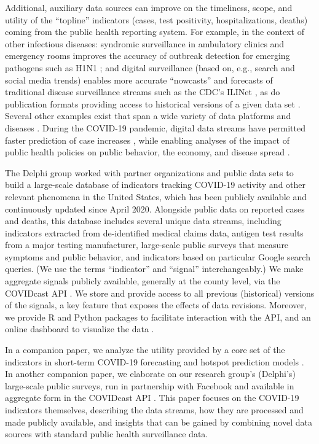 \documentclass[11pt]{article}
\begin{document}
Additional, auxiliary data sources can improve on the timeliness, scope, and
utility of the ``topline'' indicators (cases, test positivity, hospitalizations,
deaths) coming from the public health reporting system. For example, in the
context of other infectious diseases: syndromic surveillance in ambulatory
clinics and emergency rooms improves the accuracy of outbreak detection for
emerging pathogens such as H1N1 \cite{Kass-Hout:2012}; and digital surveillance
(based on, e.g., search and social media trends) enables more accurate
``nowcasts'' and forecasts of traditional disease surveillance streams such as
the CDC's ILINet \cite{Santillana:2015, Farrow:2016}, as do publication formats
providing access to historical versions of a given data set \cite{Brooks:2018,
  Brooks:2020}. Several other examples exist that span a wide variety of data
platforms and diseases \cite{Brownstein:2009, Kass-Hout:2011, Salathe:2012,
  Kass-Hout:2013}. During the COVID-19 pandemic, digital data streams have
permitted faster prediction of case increases \cite{Ahmad:2020, Kogan:2021},
while enabling analyses of the impact of public health policies on public
behavior, the economy, and disease spread \cite{Bonaccorsi:2020, Nouvellet:2021,
  Adjodah:2021, Jewell:2021}.

The Delphi group worked with partner organizations and public data sets to build
a large-scale database of indicators tracking COVID-19 activity and other
relevant phenomena in the United States, which has been publicly available and
continuously updated since April 2020. Alongside public data on reported cases
and deaths, this database includes several unique data streams, including
indicators extracted from de-identified medical claims data, antigen test
results from a major testing manufacturer, large-scale public surveys that
measure symptoms and public behavior, and indicators based on particular Google
search queries. (We use the terms ``indicator'' and ``signal'' interchangeably.)
We make aggregate signals publicly available, generally at the county level, via
the COVIDcast API \cite{CovidcastAPI}. We store and provide access to all
previous (historical) versions of the signals, a key feature that exposes the
effects of data revisions. Moreover, we provide R \cite{CovidcastR} and Python
\cite{CovidcastPy} packages to facilitate interaction with the API, and an
online dashboard to visualize the data \cite{CovidcastViz}.

In a companion paper, we analyze the utility provided by a core set of the
indicators in short-term COVID-19 forecasting and hotspot prediction models
\cite{McDonald:2021}. In another companion paper, we elaborate on our research
group's (Delphi's) large-scale public surveys, run in partnership with Facebook
and available in aggregate form in the COVIDcast API \cite{Salomon:2021}. This
paper focuses on the COVID-19 indicators themselves, describing the
data streams, how they are processed and made publicly available, and insights
that can be gained by combining novel data sources with standard public health
surveillance data.
\end{document}
